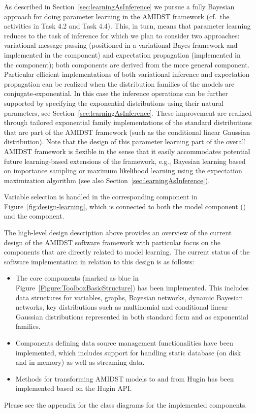 As described in Section~\ref{sec:learningAsInference} we pursue a fully Bayesian approach for doing parameter learning in the AMIDST
framework (cf.\ the activities in Task 4.2 and Task 4.4). This, in turn, means that parameter learning reduces
to the task of inference for which  we
plan to consider two approaches: variational message passing (positioned in a variational Bayes framework and implemented in the  component) and
expectation propagation (implemented in the  component); both components are derived from the more
general  component. Particular efficient
implementations of both variational inference and expectation propagation can be realized when the distribution families of the models are
conjugate-exponential. In this case the inference operations can be further supported by specifying the
exponential distributions using their natural parameters, see Section~\ref{sec:learningAsInference}. These improvement are realized
through tailored exponential family implementations of the standard distributions that are part of the AMIDST framework
(such as the conditional linear Gaussian distribution). Note that the design of this parameter learning part of
the overall AMIDST framework is flexible in the sense that it easily accommodates potential future learning-based extensions of
the framework, e.g., Bayesian learning based on importance sampling or maximum likelihood learning using the
expectation maximization algorithm (see also
Section~\ref{sec:learningAsInference}).   

Variable selection is handled in the corresponding component in Figure~\ref{fig:design-learning}, which is
connected to both the model component () and the  component. 

The high-level design description above provides an overview of the current design of the AMIDST software
framework with particular focus on the components that are directly related to model learning. The current
status of the software implementation in relation to this design is as follows:
\begin{itemize}
\item The core components (marked as blue in Figure~\ref{Figure:ToolboxBasicStructure}) has been implemented. This includes data structures
  for variables, graphs, Bayesian networks, dynamic Bayesian networks, key distributions such as multinomial
  and conditional linear Gaussian distributions represented in both standard form and as exponential families.
\item Components defining data source management functionalities have been implemented, which includes support
  for handling static database (on disk and in memory) as well as streaming data.   
\item Methods for transforming AMIDST models to and from Hugin has been implemented based on the Hugin API.  
\end{itemize}
Please see the appendix for the class diagrams for the implemented components.



